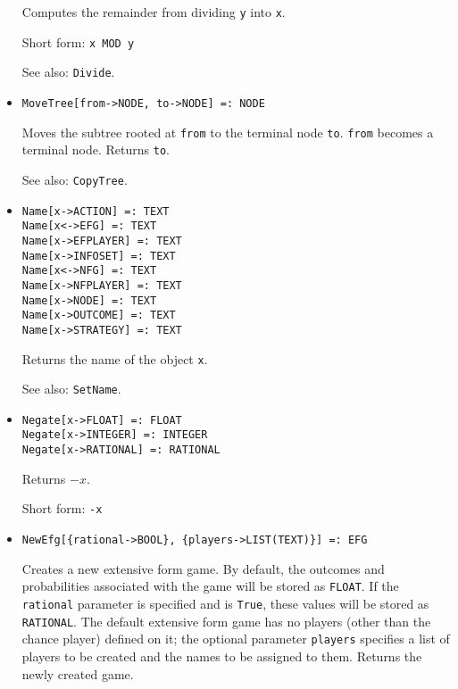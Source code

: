 \begin{itemize}
\bd
Computes the remainder from dividing \verb+y+ into \verb+x+.
\item
[Short form:] \verb+x MOD y+
\item
[See also:] {\tt Divide}.
\ed


\item
\protect \large \begin{verbatim}
MoveTree[from->NODE, to->NODE] =: NODE
\end{verbatim}\normalsize

\bd
Moves the subtree rooted at \verb+from+ to
the terminal node \verb+to+.  \verb+from+ becomes a terminal node.
Returns \verb+to+.
\item
[See also:] {\tt CopyTree}.
\ed


\item
\protect \large \begin{verbatim}
Name[x->ACTION] =: TEXT
Name[x<->EFG] =: TEXT
Name[x->EFPLAYER] =: TEXT
Name[x->INFOSET] =: TEXT
Name[x<->NFG] =: TEXT
Name[x->NFPLAYER] =: TEXT
Name[x->NODE] =: TEXT
Name[x->OUTCOME] =: TEXT
Name[x->STRATEGY] =: TEXT
\end{verbatim}\normalsize

\bd
Returns the name of the object \verb+x+.
\item
[See also:] {\tt SetName}.
\ed

\item 
\protect \large \begin{verbatim}
Negate[x->FLOAT] =: FLOAT
Negate[x->INTEGER] =: INTEGER
Negate[x->RATIONAL] =: RATIONAL
\end{verbatim} \normalsize

\bd
Returns $-x$.
\item
[Short form:] \verb+-x+
\ed


\item
\protect \large \begin{verbatim} 
NewEfg[{rational->BOOL}, {players->LIST(TEXT)}] =: EFG
\end{verbatim}\normalsize

\bd
Creates a new extensive form game.  By default, the
outcomes and probabilities associated with the game will be stored as
{\tt FLOAT}.  If the \verb+rational+ parameter is specified and is \verb+True+,
these values will be stored as {\tt RATIONAL}.  The default extensive form
game has no players (other than the chance player) defined on it; the
optional parameter \verb+players+ specifies a list of players to be
created and the names to be assigned to them.  Returns the newly created
game.
\ed


\end{itemize}

